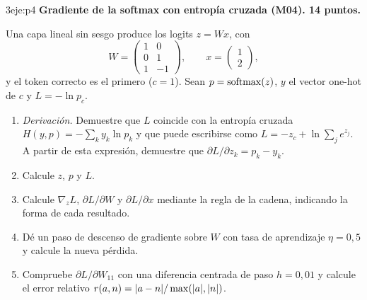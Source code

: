 \begin{ejercicio}{3}{eje:p4}
\textbf{Gradiente de la softmax con entropía cruzada (M04). 14 puntos.}

Una capa lineal sin sesgo produce los logits $z=Wx$, con
\[
W=\begin{pmatrix}1&0\\0&1\\1&-1\end{pmatrix},\qquad x=\begin{pmatrix}1\\2\end{pmatrix},
\]
y el token correcto es el primero ($c=1$). Sean $p=\operatorname{softmax}(z)$, $y$ el vector one-hot de $c$ y $L=-\ln p_c$.
\begin{enumerate}[label=(\alph*)]
  \item {} \emph{Derivación.} Demuestre que $L$ coincide con la entropía cruzada $H(y,p)=-\sum_k y_k\ln p_k$ y que puede escribirse como $L=-z_c+\ln\sum_j e^{z_j}$. A partir de esta expresión, demuestre que $\partial L/\partial z_k=p_k-y_k$.
  \item {} Calcule $z$, $p$ y $L$.
  \item {} Calcule $\nabla_z L$, $\partial L/\partial W$ y $\partial L/\partial x$ mediante la regla de la cadena, indicando la forma de cada resultado.
  \item {} Dé un paso de descenso de gradiente sobre $W$ con tasa de aprendizaje $\eta=0{,}5$ y calcule la nueva pérdida.
  \item {} Compruebe $\partial L/\partial W_{11}$ con una diferencia centrada de paso $h=0{,}01$ y calcule el error relativo $r(a,n)=\lvert a-n\rvert/\max(\lvert a\rvert,\lvert n\rvert)$.
\end{enumerate}
\end{ejercicio}

